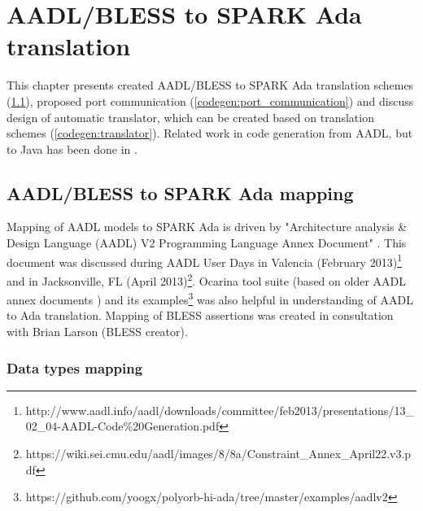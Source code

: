 
\cleardoublepage


\chapter{AADL/BLESS to SPARK Ada translation}
\label{codegen}

This chapter presents created AADL/BLESS to SPARK Ada translation schemes (\ref{codegen:mapping}), proposed port communication (\ref{codegen:port_communication}) and discuss design of automatic translator, which can be created based on translation schemes (\ref{codegen:translator}). Related work in code generation from AADL, but to Java has been done in \cite{MAP:Paper}. 



\section{AADL/BLESS to SPARK Ada mapping}
\label{codegen:mapping}


Mapping of AADL models to SPARK Ada is driven by "Architecture analysis \& Design Language (AADL) V2 Programming Language Annex Document" \cite{AnnexDoc}. This document was discussed during AADL User Days in Valencia (February 2013)\footnote{http://www.aadl.info/aadl/downloads/committee/feb2013/presentations/13\_02\_04-AADL-Code\%20Generation.pdf} and in Jacksonville, FL (April 2013)\footnote{https://wiki.sei.cmu.edu/aadl/images/8/8a/Constraint\_Annex\_April22.v3.pdf}. Ocarina tool suite (based on older AADL annex documents \cite{Ocarina:Article}) and its examples\footnote{https://github.com/yoogx/polyorb-hi-ada/tree/master/examples/aadlv2} was also helpful in understanding of AADL to Ada translation. Mapping of BLESS assertions was created in consultation with Brian Larson (BLESS creator).




\subsection{Data types mapping}
\label{codegen:mapping:data}

